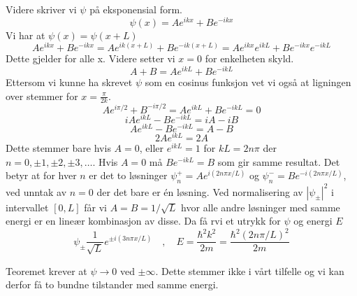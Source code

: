 \documentclass{article}
\begin{document}
Videre skriver vi $ψ$ på eksponensial form. 
\[
ψ(x) = Ae^{ikx} + Be^{-ikx}
\]
Vi har at $ψ(x) = ψ(x + L)$
\[
Ae^{ikx} + Be^{-ikx} = Ae^{ik(x+L)} + Be^{-ik(x+L)} = Ae^{ikx}e^{ikL} + Be^{-ikx}e^{-ikL}
\]
Dette gjelder for alle x. Videre setter vi $x=0$ for enkelheten skyld.
\[
A + B = Ae^{ikL} + Be^{-ikL}
\]
Ettersom vi kunne ha skrevet $ψ$ som en cosinus funksjon vet vi også at ligningen over stemmer for $x = \frac{π}{2k}$. 
\[
Ae^{iπ / 2} + B^{- iπ / 2} = Ae^{ikL} + Be^{-ikL} = 0
\]
\[
iAe^{ikL} - Be^{-ikL} = iA - iB
\]
\[
Ae^{ikL} - Be^{-ikL} = A - B
\]
\[
2Ae^{ikL} = 2A
\]
Dette stemmer bare hvis $A=0$, eller $e^{ikL}=1$ for $kL = 2nπ$ der $n =  0,±1,±2,±3, \ldots $. Hvis $A=0$ må $Be^{-ikL} = B$ som gir samme resultat. Det betyr at for hver $n$ er det to løsninger $ψ_n^{+} = Ae^{i(2nπx /L)}$ og $ψ_n^{-} = Be^{-i(2nπx /L)}$, ved unntak av $n=0$ der det bare er én løsning. Ved normalisering av $\left|ψ_{\pm}\right|^2$ i intervallet $[0,L]$ får vi $A=B = 1 /\sqrt{L}$ hvor alle andre løsninger med samme energi er en lineær kombinasjon av disse. Da få rvi et utrykk for $ψ$ og energi $E$
\[
ψ_{±} \frac{1}{\sqrt{L}} e^{±i(3nπx / L)} \quad , \quad E = \frac{ℏ^2k^2}{2m} = \frac{ℏ^2(2nπ / L)^2}{2m}
\]

Teoremet krever at $ψ → 0$ ved $\pm∞$. Dette stemmer ikke i vårt tilfelle og vi kan derfor få to bundne tilstander med samme energi. 
\end{document}

